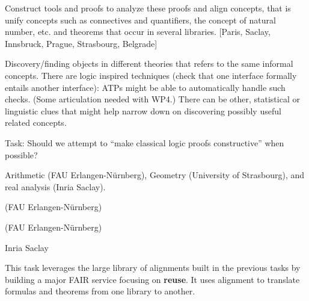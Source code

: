 \begin{workpackage}[id=alignment,wphases=0-48,type=RTD,
  short=Concept Alignment,%
  title=Concept Alignment,
  lead=Pra,
  PraRM=10]
\begin{wpdescription}
Construct tools and proofs to analyze these proofs and align concepts, that is unify
concepts such as connectives and quantifiers, the concept of natural number, etc. and
theorems that occur in several libraries.  [Paris, Saclay, Innsbruck, Prague,
Strasbourg, Belgrade]

Discovery/finding objects in different theories that refers to the
same informal concepts.
There are logic inspired techniques (check that one interface formally
entails another interface): ATPs might be able to automatically handle
such checks. (Some articulation needed with WP4.)
There can be other, statistical or linguistic clues that might help
narrow down on discovering possibly useful related concepts.

\end{wpdescription}

Task: Should we attempt to ``make classical logic proofs constructive'' when possible?

\begin{tasklist}
\begin{task}[id=aligndef,title=Tracking classical and intuitionistic proof steps in logic and arithmetic] 
\end{task}

\begin{task}[id=aligndef,title=Alignment in particular domains]
  Arithmetic (FAU Erlangen-Nürnberg), Geometry (University of
  Strasbourg), and real analysis (Inria Saclay).
\end{task}

\begin{task}[id=aligndef,title=Definition of an Alignment Language]
(FAU Erlangen-Nürnberg)
\end{task}

\begin{task}[id=translate,title=Libraries as intermediates for translations]
(FAU Erlangen-Nürnberg)
\end{task}

\begin{task}[id=translate,title=Alignment of proof structures]
Inria Saclay
\end{task}

\begin{task}[id=aligntranslate,title=FAIR Services: Reuse across Libraries,lead=FauRM,FauRM=12]
This task leverages the large library of alignments built in the previous tasks by building a major FAIR service focusing on \textbf{reuse}.
It uses alignment to translate formulas and theorems from one library to another.
\end{task}


\end{tasklist}
\end{workpackage}
